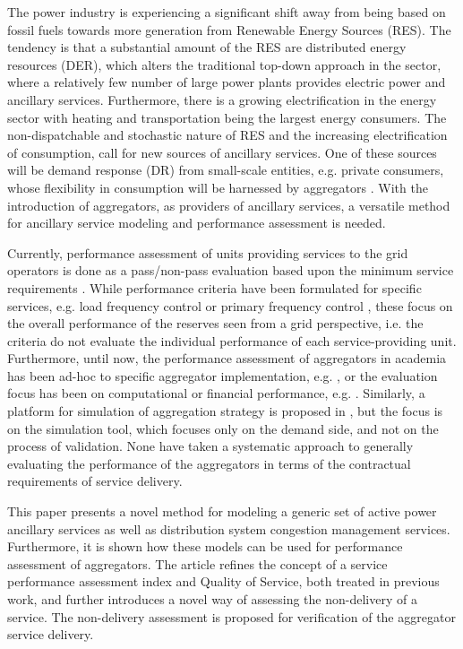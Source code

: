 The power industry is experiencing a significant shift away from being based on fossil fuels towards more generation from Renewable Energy Sources (RES). The tendency is that a substantial amount of the RES are distributed energy resources (DER), which alters the traditional top-down approach in the sector, where a relatively few number of large power plants provides electric power and ancillary services. Furthermore, there is a growing electrification in the energy sector with heating and transportation being the largest energy consumers. The non-dispatchable and stochastic nature of RES and the increasing electrification of consumption, call for new sources of ancillary services. One of these sources will be demand response (DR) from small-scale entities, e.g. private consumers, whose flexibility in consumption will be harnessed by aggregators \cite{pudjianto2007virtual}. With the introduction of aggregators, as providers of ancillary services, a versatile method for ancillary service modeling and performance assessment is needed.

Currently, performance assessment of units providing services to the grid operators is done as a pass/non-pass evaluation based upon the minimum service requirements \cite{EnerginetAncillary}. While performance criteria have been formulated for specific services, e.g. load frequency control \cite{gross2001analysis} or primary frequency control \cite{eto2010use}, these focus on the overall performance of the reserves seen from a grid perspective, i.e. the criteria do not evaluate the individual performance of each service-providing unit. Furthermore, until now, the performance assessment of aggregators in academia has been ad-hoc to specific aggregator implementation, e.g. \cite{vrettos2015frequency}, or the evaluation focus has been on computational or financial performance, e.g. \cite{su2012performance,rahnama2014evaluation}. Similarly, a platform for simulation of aggregation strategy is proposed in \cite{dittawit2014demand}, but the focus is on the simulation tool, which focuses only on the demand side, and not on the process of validation. None have taken a systematic approach to generally evaluating the performance of the aggregators in terms of the contractual requirements of service delivery. 

This paper presents a novel method for modeling a generic set of active power ancillary services as well as distribution system congestion management services. Furthermore, it is shown how these models can be used for performance assessment of aggregators. The article refines the concept of a service performance assessment index and Quality of Service, both treated in previous work, and further introduces a novel way of assessing the non-delivery of a service. The non-delivery assessment is proposed for verification of the aggregator service delivery.

